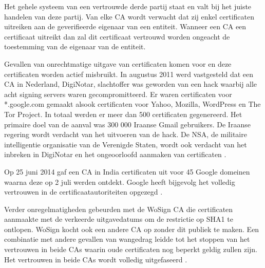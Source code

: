 Het gehele systeem van een vertrouwde derde partij staat en valt bij het juiste
handelen van deze partij. Van elke \gls{CA} wordt verwacht dat zij enkel
certificaten uitreiken aan de geverifieerde eigenaar van een entiteit. Wanneer
een \gls{CA} een
certificaat uitreikt dan zal dit certificaat vertrouwd worden ongeacht de
toestemming van de eigenaar van de entiteit.

Gevallen van onrechtmatige uitgave van certificaten komen voor en deze
certificaten worden actief misbruikt. In augustus 2011 werd vastgesteld dat een
\gls{CA} in Nederland, DigiNotar,
slachtoffer was geworden van een hack waarbij alle acht signing servers waren
gecompromitteerd. Er waren certificaten voor *.google.com gemaakt alsook
certificaten voor Yahoo, Mozilla, WordPress en The Tor Project. In totaal werden
er meer dan 500 certificaten gegenereerd. Het primaire doel van de aanval was
300 000 Iraanse Gmail gebruikers. De Iraanse regering wordt verdacht van het
uitvoeren van de hack. De NSA, de militaire intelligentie organisatie van de
Verenigde Staten, wordt ook verdacht van het inbreken in DigiNotar en het
ongeoorloofd aanmaken van certificaten \autocite{DiginotarNu,
	DigiNotarThreatpost, DigiNotarComputerworld, DigiNotarSchneier,
	DigiNotarTweakers}.

Op 25 juni 2014 gaf een \gls{CA} in India certificaten uit voor 45 Google
domeinen
waarna deze op 2 juli werden ontdekt. Google heeft bijgevolg het volledig
vertrouwen in de certificaatautoriteiten opgezegd \autocite{Wilson2014}.

Verder onregelmatigheden gebeurden met de WoSign \gls{CA} die certificaten
aanmaakte
met de verkeerde uitgavedatums om de restrictie op SHA1 te ontlopen. WoSign
kocht ook een andere \gls{CA} op zonder dit publiek te maken. Een combinatie met
andere gevallen van wangedrag leidde tot het stoppen van het vertrouwen in beide
CAs waarin oude certificaten nog beperkt geldig zullen zijn. Het vertrouwen in
beide CAs wordt volledig uitgefaseerd  \autocite{WoSignMozilla, WoSignTweakers1,
	WoSignTweakers2}.
